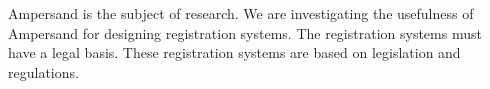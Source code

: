 \begin{comment}
Deze redeneerlijn roept vragen op:

        Waarom moet de bruikbaarheid van Ampersand worden onderzocht?
            Wat is Ampersand?
            Wat is “het gebruik” van Ampersand?
            Waarom is de bruikbaarheid van Ampersand een probleem?
        Waarom specifiek voor registratiesystemen? Wat is dat precies?
        Hoe onderzoek je de bruikbaarheid van Ampersand voor het ontwerpen van registratiesystemen?
        Waarom juist action research?

Deze vragen worden niet in de introductie beantwoord, wat bij mij als lezer een onbevredigend gevoel achterlaat. Maar hoe doe je dat? Welnu: Door deze vragen te beantwoorden in je betoog krijg je een veel betere redeneerlijn. Immers, alle vragen die je oproept heb je beantwoord. Ik heb de verkorte antwoorden achter de vragen gezet, bij wijze van voorbeeld. Overigens, ook die antwoorden roepen vragen op, maar die vragen zitten een niveautje dieper. Ik heb er een aantal bij opgeschreven. Die vragen kun je dus in de daaropvolgende hoofdstukken beantwoorden.

   
\end{comment}
\begin{comment}
    \item Wat is het onderzoek? Antw: we onderzoeken de bruikbaarheid van Ampersand voor het ontwerpen van registratiesystemen.
    \item Waarom moet de bruikbaarheid van Ampersand worden onderzocht? (antw: we zien dat het gebruik van Ampersand uitblijft)
    \begin{enumerate}
        \item Wat is Ampersand? (antw: Ampersand is een formele taal die registratiesystemen specificeert)
        \item Wat is het gebruik van Ampersand? (antw: Software engineers kunnen Ampersand gebruiken om registratiesystemen te ontwerpen en er prototypes van te maken.)
        \item Waarom is de bruikbaarheid van Ampersand een probleem? (antw: Ampersand wordt nauwelijks gebruikt, terwijl het wel werkt.)
        \begin{enumerate}
            \item Zijn er vergelijkbare systemen met vergelijkbare bruikbaarheidsproblemen?
            \item Wat zouden mogelijk oorzaken kunnen zijn?
        \end{enumerate}
    \item Waarom specifiek voor registratiesystemen? Wat zijn dat eigenlijk? (beantwoorden vanuit de literatuur, en goed afbakenen, maar wel zodanig dat het BIG-register er binnen valt.)        
    \end{enumerate} 
\end{comment}
Ampersand is the subject of research.
We are investigating the usefulness of Ampersand for designing registration systems.
The registration systems must have a legal basis.
These registration systems are based on legislation and regulations.

